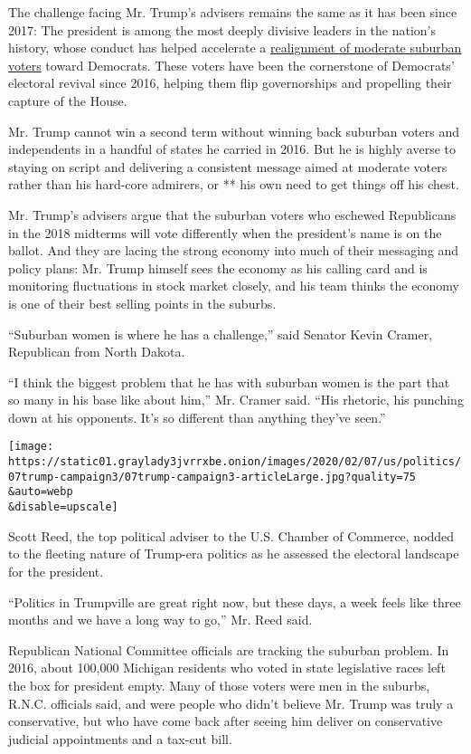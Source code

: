 The challenge facing Mr. Trump's advisers remains the same as it has
been since 2017: The president is among the most deeply divisive leaders
in the nation's history, whose conduct has helped accelerate a
\href{https://www.nytimes3xbfgragh.onion/2019/11/06/us/politics/kentucky-governor-virginia-election.html}{realignment
of moderate suburban voters} toward Democrats. These voters have been
the cornerstone of Democrats' electoral revival since 2016, helping them
flip governorships and propelling their capture of the House.

Mr. Trump cannot win a second term without winning back suburban voters
and independents in a handful of states he carried in 2016. But he is
highly averse to staying on script and delivering a consistent message
aimed at moderate voters rather than his hard-core admirers, or ** his
own need to get things off his chest.

Mr. Trump's advisers argue that the suburban voters who eschewed
Republicans in the 2018 midterms will vote differently when the
president's name is on the ballot. And they are lacing the strong
economy into much of their messaging and policy plans: Mr. Trump himself
sees the economy as his calling card and is monitoring fluctuations in
stock market closely, and his team thinks the economy is one of their
best selling points in the suburbs.

``Suburban women is where he has a challenge,'' said Senator Kevin
Cramer, Republican from North Dakota.

``I think the biggest problem that he has with suburban women is the
part that so many in his base like about him,'' Mr. Cramer said. ``His
rhetoric, his punching down at his opponents. It's so different than
anything they've seen.''

\texttt{[image: https://static01.graylady3jvrrxbe.onion/images/2020/02/07/us/politics/07trump-campaign3/07trump-campaign3-articleLarge.jpg?quality=75\\\&auto=webp\\\&disable=upscale]}

Scott Reed, the top political adviser to the U.S. Chamber of Commerce,
nodded to the fleeting nature of Trump-era politics as he assessed the
electoral landscape for the president.

``Politics in Trumpville are great right now, but these days, a week
feels like three months and we have a long way to go,'' Mr. Reed said.

Republican National Committee officials are tracking the suburban
problem. In 2016, about 100,000 Michigan residents who voted in state
legislative races left the box for president empty. Many of those voters
were men in the suburbs, R.N.C. officials said, and were people who
didn't believe Mr. Trump was truly a conservative, but who have come
back after seeing him deliver on conservative judicial appointments and
a tax-cut bill.

